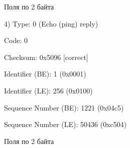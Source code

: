 \documentclass[a4paper,11pt]{article}
\begin{document}
Поля по 2 байта

\begin{center}
\label{fig:image}
\end{center}
4) Type: 0 (Echo (ping) reply)

Code: 0

Checksum: 0x5096 [correct]

Identifier (BE): 1 (0x0001)

Identifier (LE): 256 (0x0100)

Sequence Number (BE): 1221 (0x04c5)

Sequence Number (LE): 50436 (0xc504)

Поля по 2 байта

\begin{center}
\label{fig:image}
\end{center}
\end{document}
